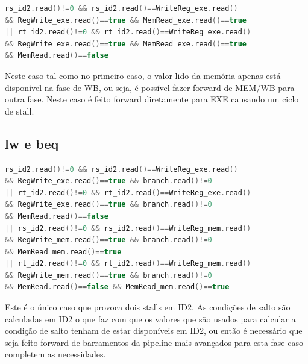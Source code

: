 \documentclass[pdftex,12pt,a4paper]{report}
\begin{document}
\begin{lstlisting}[language = c]
rs_id2.read()!=0 && rs_id2.read()==WriteReg_exe.read() 
&& RegWrite_exe.read()==true && MemRead_exe.read()==true
|| rt_id2.read()!=0 && rt_id2.read()==WriteReg_exe.read() 
&& RegWrite_exe.read()==true && MemRead_exe.read()==true 
&& MemRead.read()==false
\end{lstlisting}

Neste caso tal como no primeiro caso, o valor lido da memória apenas está disponível na fase de WB, ou seja, é possível fazer forward de MEM/WB para outra fase. Neste caso é feito forward diretamente para EXE causando um ciclo de stall. 
\newpage
\subsection{lw e beq}
\begin{table}[!htb]
\centering
\label{my-label}
\end{table}

\begin{lstlisting}[language = c]
rs_id2.read()!=0 && rs_id2.read()==WriteReg_exe.read() 
&& RegWrite_exe.read()==true && branch.read()!=0
|| rt_id2.read()!=0 && rt_id2.read()==WriteReg_exe.read()
&& RegWrite_exe.read()==true && branch.read()!=0 
&& MemRead.read()==false
|| rs_id2.read()!=0 && rs_id2.read()==WriteReg_mem.read() 
&& RegWrite_mem.read()==true && branch.read()!=0 
&& MemRead_mem.read()==true
|| rt_id2.read()!=0 && rt_id2.read()==WriteReg_mem.read() 
&& RegWrite_mem.read()==true && branch.read()!=0 
&& MemRead.read()==false && MemRead_mem.read()==true

\end{lstlisting}

Este é o único caso que provoca dois stalls em ID2. As condições de salto são calculadas em ID2 o que faz com que os valores que são usados para calcular a condição de salto tenham de estar disponíveis em ID2, ou então é necessário que seja feito forward de barramentos da pipeline mais avançados para esta fase caso completem as necessidades. 
\end{document}
